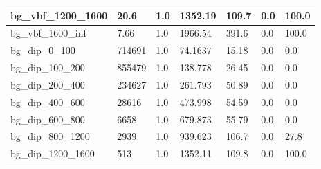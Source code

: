 \documentclass[a4paper, 10pt]{article}
\begin{document}
\begin{table}[H]
\begin{center}
\begin{tabular}{|m{23.0mm}|m{23.0mm}|m{18.0mm}|m{19.0mm}|m{19.0mm}|m{19.0mm}|m{19.0mm}|}
      \hline
      {\cellcolor{white}         bg\_vbf\_1200\_1600}& {\cellcolor{white}         20.6}& {\cellcolor{white}         1.0}& {\cellcolor{white}         1352.19}& {\cellcolor{white}         109.7}& {\cellcolor{red}         0.0}& {\cellcolor{red}         100.0}\\
      \hline
      {\cellcolor{white}         bg\_vbf\_1600\_inf}& {\cellcolor{white}         7.66}& {\cellcolor{white}         1.0}& {\cellcolor{white}         1966.54}& {\cellcolor{white}         391.6}& {\cellcolor{red}         0.0}& {\cellcolor{red}         100.0}\\
      \hline
      {\cellcolor{white}         bg\_dip\_0\_100}& {\cellcolor{white}         714691}& {\cellcolor{white}         1.0}& {\cellcolor{white}         74.1637}& {\cellcolor{white}         15.18}& {\cellcolor{green}         0.0}& {\cellcolor{green}         0.0}\\
      \hline
      {\cellcolor{white}         bg\_dip\_100\_200}& {\cellcolor{white}         855479}& {\cellcolor{white}         1.0}& {\cellcolor{white}         138.778}& {\cellcolor{white}         26.45}& {\cellcolor{green}         0.0}& {\cellcolor{green}         0.0}\\
      \hline
      {\cellcolor{white}         bg\_dip\_200\_400}& {\cellcolor{white}         234627}& {\cellcolor{white}         1.0}& {\cellcolor{white}         261.793}& {\cellcolor{white}         50.89}& {\cellcolor{green}         0.0}& {\cellcolor{green}         0.0}\\
      \hline
      {\cellcolor{white}         bg\_dip\_400\_600}& {\cellcolor{white}         28616}& {\cellcolor{white}         1.0}& {\cellcolor{white}         473.998}& {\cellcolor{white}         54.59}& {\cellcolor{green}         0.0}& {\cellcolor{green}         0.0}\\
      \hline
      {\cellcolor{white}         bg\_dip\_600\_800}& {\cellcolor{white}         6658}& {\cellcolor{white}         1.0}& {\cellcolor{white}         679.873}& {\cellcolor{white}         55.79}& {\cellcolor{green}         0.0}& {\cellcolor{green}         0.0}\\
      \hline
      {\cellcolor{white}         bg\_dip\_800\_1200}& {\cellcolor{white}         2939}& {\cellcolor{white}         1.0}& {\cellcolor{white}         939.623}& {\cellcolor{white}         106.7}& {\cellcolor{red}         0.0}& {\cellcolor{red}         27.8}\\
      \hline
      {\cellcolor{white}         bg\_dip\_1200\_1600}& {\cellcolor{white}         513}& {\cellcolor{white}         1.0}& {\cellcolor{white}         1352.11}& {\cellcolor{white}         109.8}& {\cellcolor{red}         0.0}& {\cellcolor{red}         100.0}\\

\end{tabular}
\end{center}
\end{table}
\end{document}
